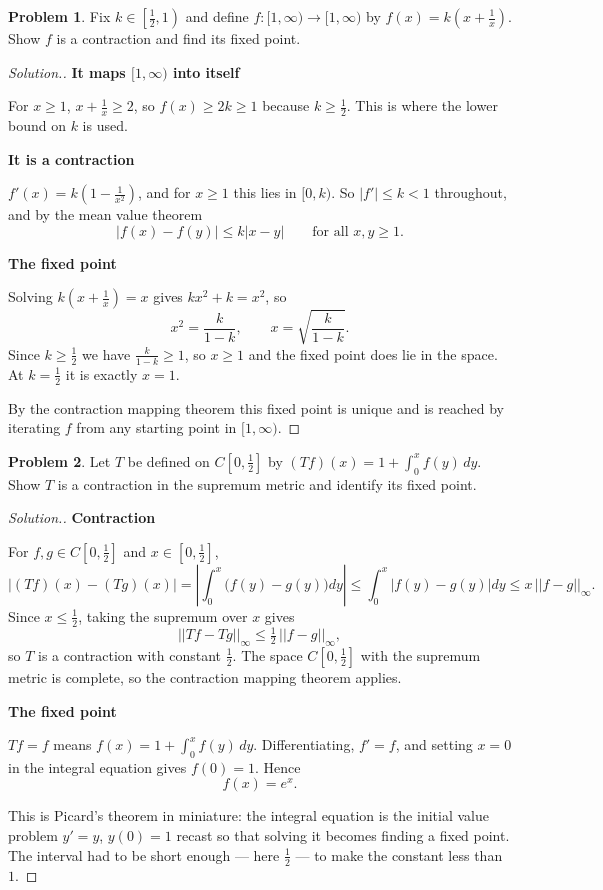 \documentclass[11pt,a4paper]{article}
\theoremstyle{definition}
\newtheorem{problemx}{Problem}[section]
\newenvironment{problem}{\begin{problemx}}{\end{problemx}}
\newenvironment{solution}
  {\renewcommand{\qedsymbol}{}\begin{proof}[\textit{Solution}.]}
  {\end{proof}}
\newcommand{\subhead}[1]{%
  \par\medskip\noindent\textbf{#1}\par\nobreak\smallskip}
\begin{document}
\begin{problem}
Fix $k\in\left[\frac12,1\right)$ and define $f:[1,\infty)\rightarrow[1,\infty)$
by $f(x)=k\left(x+\frac{1}{x}\right)$. Show $f$ is a contraction and find its
fixed point.
\end{problem}
\begin{solution}
\subhead{It maps $[1,\infty)$ into itself}
For $x\geq 1$, $x+\frac1x\geq 2$, so $f(x)\geq 2k\geq 1$ because
$k\geq\frac12$. This is where the lower bound on $k$ is used.

\subhead{It is a contraction}
$f'(x)=k\left(1-\frac{1}{x^2}\right)$, and for $x\geq 1$ this lies in $[0,k)$.
So $|f'|\leq k<1$ throughout, and by the mean value theorem
$$|f(x)-f(y)|\leq k|x-y| \qquad\text{for all }x,y\geq 1 .$$

\subhead{The fixed point}
Solving $k\left(x+\frac1x\right)=x$ gives $kx^2+k=x^2$, so
$$x^2=\frac{k}{1-k},\qquad x=\sqrt{\frac{k}{1-k}} .$$
Since $k\geq\frac12$ we have $\frac{k}{1-k}\geq 1$, so $x\geq 1$ and the fixed
point does lie in the space. At $k=\frac12$ it is exactly $x=1$.

By the contraction mapping theorem this fixed point is unique and is reached by
iterating $f$ from any starting point in $[1,\infty)$.
\end{solution}

\begin{problem}
Let $T$ be defined on $C\left[0,\frac12\right]$ by
$\displaystyle{(Tf)(x)=1+\int_0^x f(y)\,dy}$. Show $T$ is a contraction in the
supremum metric and identify its fixed point.
\end{problem}
\begin{solution}
\subhead{Contraction}
For $f,g\in C\left[0,\frac12\right]$ and $x\in\left[0,\frac12\right]$,
$$\big|(Tf)(x)-(Tg)(x)\big|=\left|\int_0^x\big(f(y)-g(y)\big)dy\right|
\leq\int_0^x\big|f(y)-g(y)\big|dy\leq x\,||f-g||_\infty .$$
Since $x\leq\frac12$, taking the supremum over $x$ gives
$$||Tf-Tg||_\infty\leq\tfrac12\,||f-g||_\infty ,$$
so $T$ is a contraction with constant $\frac12$. The space
$C\left[0,\frac12\right]$ with the supremum metric is complete, so the
contraction mapping theorem applies.

\subhead{The fixed point}
$Tf=f$ means $f(x)=1+\int_0^x f(y)\,dy$. Differentiating, $f'=f$, and setting
$x=0$ in the integral equation gives $f(0)=1$. Hence
$$f(x)=e^{x}.$$

This is Picard's theorem in miniature: the integral equation is the initial
value problem $y'=y$, $y(0)=1$ recast so that solving it becomes finding a
fixed point. The interval had to be short enough --- here $\frac12$ --- to make
the constant less than $1$.
\end{solution}
\end{document}
